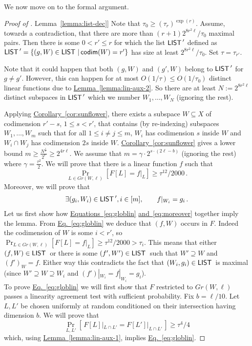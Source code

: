 \documentclass[11pt]{article}
\numberwithin{equation}{section}
\theoremstyle{definition}
\theoremstyle{plain}
\newcommand{\expref}[2]{\hyperref[#2]{#1~\ref{#2}}}
\newcommand{\expeqref}[2]{\hyperref[#2]{#1~\eqref{#2}}}
\newcommand\Set[2]{ \left\{ #1 \,  \vert  \, #2\right\} }
\newcommand*\codimm{{\sf codim}}
\renewcommand\geq{\geqslant}
\renewcommand\ge{\geqslant}
\renewcommand\leq{\leqslant}
\renewcommand\le{\leqslant}
\renewcommand\subset{\subseteq}
\renewcommand\supset{\supseteq}
\def\M{{\sf LIST\,}}
\begin{document}
We now move on to the formal argument.
\begin{proof}[Proof of \expref{Lemma}{lemma:list-dec}] Note that
%
$\tau_0 \ge (\tau_r)^{\exp(r)}$.    %
Assume, towards a contradiction, that there are more than $(r+1)2^{8r^2\ell}/\tau_0$ maximal pairs.
Then there is some $0< r'\le r$ for which the list $\M'$ defined as $\M' = \Set{(g,W)\in \M }{ \codimm(W)=r'}$ has size at least $2^{8r^2\ell}/\tau_0$. Set $\tau = \tau_{r'}$.

Note that it could happen that both $(g,W)$ and $(g',W)$ belong to $\M'$ for $g\neq g'$. However, this can happen for at most $O(1/\tau) \le O(1/\tau_0)$ distinct linear functions due to \expref{Lemma}{lemma:lin-aux-2}. So there are at least $N:=2^{8r^2\ell}$ distinct subspaces in $\M'$ which we number $W_1,\ldots,W_N$ (ignoring the rest).
%

Applying \expref{Corollary}{cor:sunflower}, there exists a subspace $W\subset X$ of codimension $r'-s$, $1\leq s <r'$, that contains (by re-indexing) subspaces
$W_1, \ldots, W_m$ such that for all $1 \leq i\not=j \leq m$, $W_i$ has codimension
$s$ inside $W$ and $W_i \cap W_j$ has codimension $2s$ inside $W$.
\expref{Corollary}{cor:sunflower} gives a lower bound
 $m \geq  \frac{N^{\frac{1}{r}}}{2^r} \geq 2^{4r \ell}$. We assume that $m = \gamma \cdot 2^{s \cdot (2\ell -b)}$ (ignoring the rest) where
 $\gamma = \frac{\tau^2}{2}$.
We will prove that there is a linear function $f$ such that
\begin{equation}\label{eq:globlin}
  \Pr_{L\in Gr(W,\ell)}[ F[L] = f|_L] \ge \tau^{12}/2000\,.
\end{equation}
Moreover, we will prove that
\begin{equation}\label{eq:moreover}
\exists (g_i,W_i)\in \M', i\in [m],\qquad f|_{W_i} = g_i\,.
\end{equation}
Let us first show how %
\expeqref{Equations}{eq:globlin} \expeqref{and}{eq:moreover} %
together imply the lemma. From \expeqref{Eq.}{eq:globlin} we deduce that
$(f,W)$ occurs in $F$. Indeed the codimension of $W$ is some
$i < r'$, so
$ \Pr_{L\in Gr(W,\ell)}[ F[L] = f|_L] \ge \tau^{12}/2000
>\tau_i$. This means that either $(f,W) \in \M$ or there is some
$(f',W')\in \M$ such that $W'\supset W$ and $(f')_W=f$.
%
Either way this contradicts the fact that $(W_i,g_i) \in \M$ is maximal (since $W'\supset W\supset W_i$ and $(f')|_{W_i} = f|_{W_i} = g_i$).\\


To prove \expeqref{Eq.}{eq:globlin} we will first show that $F$ restricted to $Gr(W,\ell)$ passes a linearity agreement test with sufficient probability. Fix $b= \ell/10$. Let $L,L'$ be chosen uniformly at random conditioned on their intersection having dimension $b$. We will prove that
\begin{equation}\label{eq:local-agreement}
  \Pr_{L,L'}[ \, F[L]|_{L\cap L'} = F[L']|_{L\cap L'} \,] \ge \tau^4/4
\end{equation}
%
which, using \expref{Lemma}{lemma:lin-aux-1}, implies \expeqref{Eq.}{eq:globlin}.


\end{proof}
\end{document}
